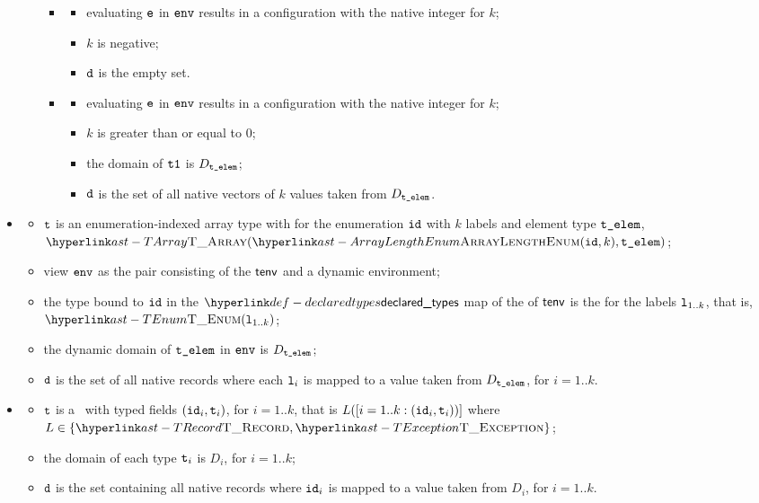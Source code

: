 \begin{itemize}
\begin{itemize}
\begin{itemize}
      \item {}
      \begin{itemize}
        \item evaluating $\texttt{e}$ in $\texttt{env}$ results in a configuration with the native integer for $k$;
        \item $k$ is negative;
        \item $\texttt{d}$ is the empty set.
      \end{itemize}

      \item {}
      \begin{itemize}
        \item evaluating $\texttt{e}$ in $\texttt{env}$ results in a configuration with the native integer for $k$;
        \item $k$ is greater than or equal to $0$;
        \item the domain of $\texttt{t1}$ is $D_{\texttt{t\_elem}}$;
        \item $\texttt{d}$ is the set of all native vectors of $k$ values taken from $D_{\texttt{t\_elem}}$.
      \end{itemize}
    \end{itemize}
  \end{itemize}

  \item {}
  \begin{itemize}
    \item $\texttt{t}$ is an enumeration-indexed array type with for the enumeration $\texttt{id}$ with $k$ labels and element type $\texttt{t\_elem}$,
          $\TArray(\ArrayLengthEnum(\id, k), \telem)$;
    \item view $\texttt{env}$ as the pair consisting of the \staticenvironmentterm{} $\textsf{tenv}$ and a dynamic environment;
    \item the type bound to $\texttt{id}$ in the $\declaredtypes$ map of the \staticenvironmentterm{} of $\textsf{tenv}$ is the \enumerationtypeterm{}
          for the labels $\texttt{l}_{1..k}$, that is, $\TEnum(\vl_{1..k})$;
    \item the dynamic domain of $\texttt{t\_elem}$ in $\texttt{env}$ is $D_{\texttt{t\_elem}}$;
    \item $\texttt{d}$ is the set of all native records where each $\texttt{l}_i$ is mapped to a value taken from $D_{\texttt{t\_elem}}$, for $i=1..k$.
  \end{itemize}

  \item {}
  \begin{itemize}
    \item $\texttt{t}$ is a \structuredtype\ with typed fields $(\texttt{id}_i, \texttt{t}_i)$, for $i=1..k$, that is $L([i=1..k: (\texttt{id}_i,\texttt{t}_i))]$
    where $L\in\{\TRecord, \TException\}$;
    \item the domain of each type $\texttt{t}_i$ is $D_i$, for $i=1..k$;
    \item $\texttt{d}$ is the set containing all native records where $\texttt{id}_i$ is mapped to a value taken from $D_i$, for $i=1..k$.
  \end{itemize}


\end{itemize}
